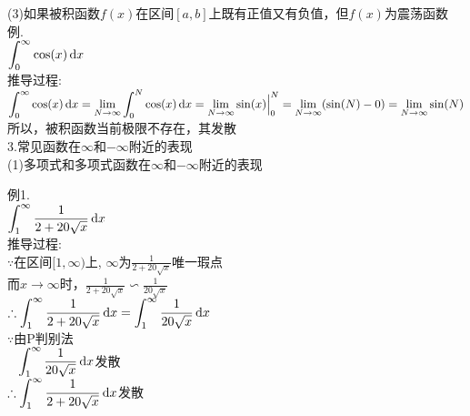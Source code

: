 (3)如果被积函数$f(x)$在区间$[a,b]$上既有正值又有负值，但$f(x)$为震荡函数\\
例.\\
$\displaystyle\int_0^{\infty}\cos(x)\mathop{}\!\mathrm{d} x$\\
推导过程:\\
$\displaystyle\int_0^{\infty}\cos(x)\mathop{}\!\mathrm{d} x=\lim_{N\to\infty}\int_0^N\cos(x)\mathop{}\!\mathrm{d} x=\lim_{N\to\infty}\sin(x)\Big|_0^N=\lim_{N\to\infty}(\sin(N)-0)=\lim_{N\to\infty}\sin(N)$\\
所以，被积函数当前极限不存在，其发散\\[2ex]

3.常见函数在$\infty$和$-\infty$附近的表现\\
(1)多项式和多项式函数在$\infty$和$-\infty$附近的表现\\
\begin{center}
\end{center}
例1.\\
$\displaystyle\int_1^{\infty}\frac{1}{2+20\sqrt{x}}\mathop{}\!\mathrm{d} x$\\
推导过程:\\
$\because$在区间$[1,\infty)$上, $\infty$为$\displaystyle\frac{1}{2+20\sqrt{x}}$唯一瑕点\\
\phantom{$because$}而$x\to\infty$时，$\displaystyle\frac{1}{2+20\sqrt{x}}\backsim\frac{1}{20\sqrt{x}}$\\
$\displaystyle\therefore\int_1^{\infty}\frac{1}{2+20\sqrt{x}}\mathop{}\!\mathrm{d} x=\int_1^{\infty}\frac{1}{20\sqrt{x}}\mathop{}\!\mathrm{d} x$\\
$\because$由P判别法\\
$\displaystyle\phantom{\because}\int_1^{\infty}\frac{1}{20\sqrt{x}}\mathop{}\!\mathrm{d} x$发散\\
$\displaystyle\therefore\int_1^{\infty}\frac{1}{2+20\sqrt{x}}\mathop{}\!\mathrm{d} x$发散\\[1ex]

